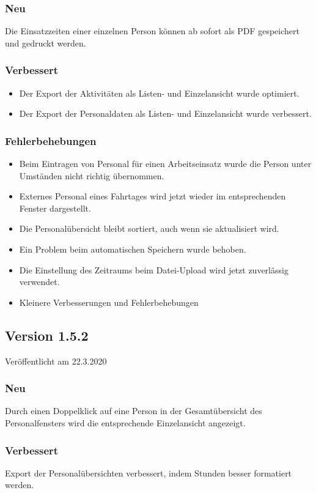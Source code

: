 \subsubsection{Neu}
Die Einsatzzeiten einer einzelnen Person können ab sofort als PDF gespeichert und gedruckt werden.

\subsubsection{Verbessert}
\begin{itemize}
  \item
  Der Export der Aktivitäten als Listen- und Einzelansicht wurde optimiert.
  \item
  Der Export der Personaldaten als Listen- und Einzelansicht wurde verbessert.
\end{itemize}

\subsubsection{Fehlerbehebungen}
\begin{itemize}
  \item
  Beim Eintragen von Personal für einen Arbeitseinsatz wurde die Person unter Umständen nicht richtig übernommen.
  \item
  Externes Personal eines Fahrtages wird jetzt wieder im entsprechenden Fenster dargestellt.
  \item
  Die Personalübersicht bleibt sortiert, auch wenn sie aktualisiert wird.
  \item
  Ein Problem beim automatischen Speichern wurde behoben.
  \item
  Die Einstellung des Zeitraums beim Datei-Upload wird jetzt zuverlässig verwendet.
  \item
  Kleinere Verbesserungen und Fehlerbehebungen
\end{itemize}


\subsection{Version 1.5.2}
Veröffentlicht am 22.3.2020
\subsubsection{Neu}
Durch einen Doppelklick auf eine Person in der Gesamtübersicht des Personalfensters wird die entsprechende Einzelansicht angezeigt.

\subsubsection{Verbessert}
Export der Personalübersichten verbessert, indem Stunden besser formatiert werden.

